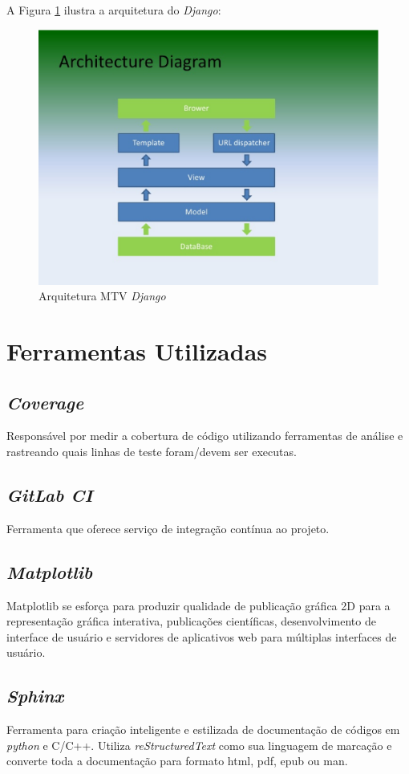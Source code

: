 A Figura \ref{django-arq} ilustra a arquitetura do \textit{Django}:

\begin{figure}[h]
    \centering
    \includegraphics[keepaspectratio=true,scale=0.5]{figuras/django-arquitetura.eps}
    \caption{Arquitetura MTV \textit{Django}}
    \label{django-arq}
\end{figure}

\section{Ferramentas Utilizadas}
    \subsection{\textit{Coverage}}
    Responsável por medir a cobertura de código utilizando ferramentas de análise e rastreando quais
    linhas de teste foram/devem ser executas.

    \subsection{\textit{GitLab CI}}
    Ferramenta que oferece serviço de integração contínua ao projeto.

    \subsection{\textit{Matplotlib}}
    Matplotlib se esforça para produzir qualidade de publicação gráfica 2D para a representação gráfica interativa, publicações científicas, desenvolvimento de interface de usuário e servidores de aplicativos web para múltiplas interfaces de usuário.

    \subsection{\textit{Sphinx}}
    Ferramenta para criação inteligente e estilizada de documentação de códigos em \textit{python} e C/C++. Utiliza \textit{reStructuredText} como sua linguagem de marcação e converte toda a documentação
    para formato html, pdf, epub ou man.

